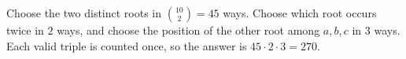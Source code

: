 Choose the two distinct roots in $\binom{10}{2}=45$ ways. Choose which root occurs twice in $2$ ways, and choose the position of the other root among $a,b,c$ in $3$ ways. Each valid triple is counted once, so the answer is $\boxed{45\cdot2\cdot3=270}$.
